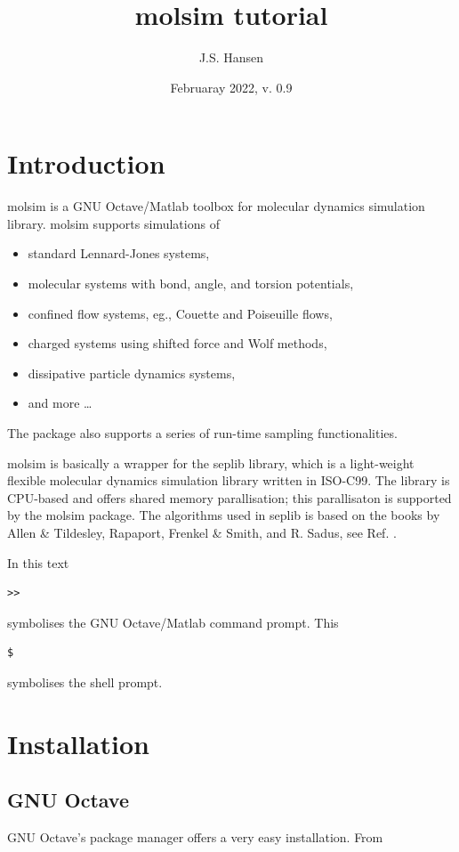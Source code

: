 \documentclass[11pt]{article}
\title{\textsf{molsim} tutorial}
\author{J.S. Hansen}
\date{Februaray 2022, v. 0.9}
\begin{document}
\maketitle

\section{Introduction}

\textsf{molsim} is a GNU Octave/Matlab toolbox for molecular dynamics simulation
library. \textsf{molsim} supports simulations of
\begin{itemize}
\item standard Lennard-Jones systems,
\item molecular systems with bond, angle, and torsion potentials, 
\item confined flow systems, eg., Couette and Poiseuille flows,
\item charged systems using shifted force and Wolf methods,
\item dissipative particle dynamics systems,
\item and more \ldots
\end{itemize}
The package also supports a series of run-time sampling functionalities.

\bigskip
\noindent \textsf{molsim} is basically a wrapper for the \textsf{seplib}
library, which is a light-weight flexible molecular dynamics simulation library
written in ISO-C99. The library is CPU-based and offers shared memory
parallisation; this parallisaton is supported by the \textsf{molsim}
package. The algorithms used in \textsf{seplib} is based on the books by Allen
\& Tildesley, Rapaport, Frenkel \& Smith, and R. Sadus, see
Ref. \cite{seplib:books}.

\bigskip
\noindent In this text
\begin{verbatim}
>> 
\end{verbatim}
symbolises the GNU Octave/Matlab command prompt. This 
\begin{verbatim}
$ 
\end{verbatim}
symbolises the shell prompt.

\section{Installation}
\subsection{GNU Octave}
GNU Octave's package manager offers a very easy installation. From
\end{document}
